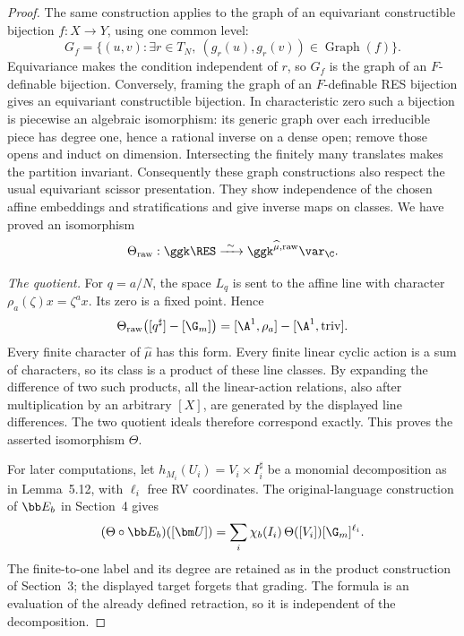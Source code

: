 \begin{proof}
The same construction applies to the graph of an equivariant
constructible bijection $f:X\to Y$, using one common level:
\[
 G_f=\{(u,v):\exists r\in T_N,\
              (g_r(u),g_r(v))\in\operatorname{Graph}(f)\}.
\]
Equivariance makes the condition independent of $r$, so $G_f$
is the graph of an $F$-definable bijection.
Conversely, framing the graph of an $F$-definable RES bijection
gives an equivariant constructible bijection.
In characteristic zero such a bijection is piecewise an
algebraic isomorphism: its generic graph over each irreducible
piece has degree one, hence a rational inverse on a dense open;
remove those opens and induct on dimension. Intersecting the
finitely many translates makes the partition invariant.
Consequently these graph constructions also respect the usual
equivariant scissor presentation. They show independence of the
chosen affine embeddings and stratifications and give inverse
maps on classes. We have proved an isomorphism
\[
 \Theta_{\mathrm{raw}}:\ggk\RES\xrightarrow{\ \sim\ }\ggk^{\widehat\mu,\mathrm{raw}}\var_{\C} .
\]

\emph{The quotient.}
For $q=a/N$, the space $L_q$ is sent to the affine line with
character $\rho_a(\zeta)x=\zeta^a x$. Its zero is a fixed point.
Hence
\[
 \Theta_{\mathrm{raw}}
 \bigl([q^\sharp]-[\G_m]\bigr)
 =
 [\A^1,\rho_a]-[\A^1,\mathrm{triv}].
\]
Every finite character of $\widehat\mu$ has this form.
Every finite linear cyclic action is a sum of characters, so its
class is a product of these line classes. By expanding the
difference of two such products, all the linear-action relations,
also after multiplication by an arbitrary $[X]$, are generated
by the displayed line differences. The two quotient ideals
therefore correspond exactly. This proves the asserted
isomorphism $\Theta$.

For later computations, let
$h_{M_i}(U_i)=V_i\times I_i^\sharp$ be a monomial decomposition
as in Lemma~5.12, with $\ell_i$ free RV coordinates.
The original-language construction of $\bb E_b$ in Section~4 gives
\begin{equation}\label{twist:C}
 (\Theta\circ\bb E_b)([\bm U])
   =\sum_i\chi_b(I_i)\,\Theta([V_i])[\G_m]^{\ell_i}.
\end{equation}
The finite-to-one label and its degree are retained as in the
product construction of Section~3; the displayed target forgets
that grading. The formula is an evaluation of the already defined
retraction, so it is independent of the decomposition.
\end{proof}

